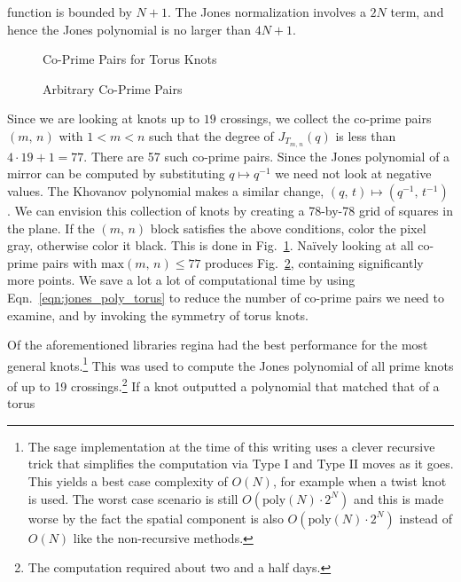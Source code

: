 function is bounded by $N+1$. The Jones normalization involves a $2N$ term,
and hence the Jones polynomial is no larger than $4N+1$.
\begin{figure}
    \centering
    \caption{Co-Prime Pairs for Torus Knots}
    \label{fig:gcd_plot_torus_knots}
\end{figure}
\begin{figure}
    \centering
    \caption{Arbitrary Co-Prime Pairs}
    \label{fig:gcd_plot}
\end{figure}
Since we are looking at knots up to $19$ crossings, we collect the
co-prime pairs $(m,\,n)$ with $1<m<n$ such that the degree of
$J_{T_{m,\,n}}(q)$
is less than $4\cdot{19}+1=77$. There are 57 such co-prime pairs.
Since the Jones polynomial of a mirror
can be computed by substituting $q\mapsto{q}^{-1}$ we need not look at
negative values. The Khovanov polynomial makes a similar change,
$(q,\,t)\mapsto(q^{-1},\,t^{-1})$ \cite{WatsonKhovanovHomology2017}.
We can envision this
collection of knots by creating a 78-by-78 grid of squares in the plane.
If the $(m,\,n)$ block satisfies the above conditions, color the pixel gray,
otherwise color it black. This is done in Fig.~\ref{fig:gcd_plot_torus_knots}.
Na\"{i}vely looking at all co-prime pairs with $\textrm{max}(m,\,n)\leq{77}$
produces Fig.~\ref{fig:gcd_plot},
containing significantly more points. We save a lot a lot of
computational time by using Eqn.~\ref{eqn:jones_poly_torus} to reduce the
number of co-prime pairs we need to examine, and by
invoking the symmetry of torus knots.
\par\hfill\par
Of the aforementioned libraries regina had the best performance for the most
general knots.\footnote{%
    The sage implementation at the time of this writing uses a clever recursive
    trick that simplifies the computation via Type I and Type II moves as it
    goes. This yields a best case complexity of $O(N)$, for example when a
    twist knot is used. The worst case scenario is still
    $O(\textrm{poly}(N)\cdot{2}^{N})$ and this
    is made worse by the fact the spatial component is also
    $O(\textrm{poly}(N)\cdot{2}^{N})$ instead
    of $O(N)$ like the non-recursive methods.
}
This was used to compute the Jones polynomial of all prime knots of up to
19 crossings.\footnote{%
    The computation required about two and a half days.
}
If a knot outputted a polynomial that matched that of a torus
